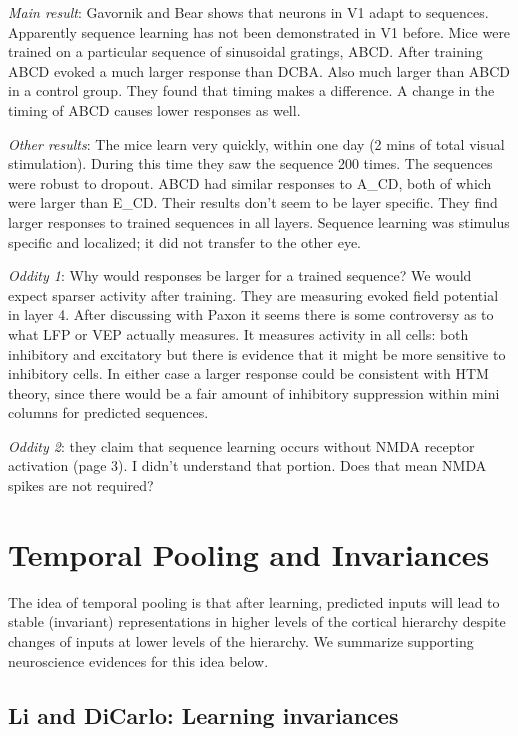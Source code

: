 \documentclass{article} %
\begin{document}
\emph{Main result}: Gavornik and Bear \cite{Gavornik2014} shows that neurons in
V1 adapt to sequences. Apparently sequence learning has not been demonstrated in
V1 before. Mice were trained on a particular sequence of sinusoidal gratings,
ABCD.  After training ABCD evoked a much larger response than DCBA. Also much
larger than ABCD in a control group.  They found that timing makes a difference.
A change in the timing of ABCD causes lower responses as well.

\emph{Other results}: The mice learn very quickly, within one day (2 mins of
total
visual stimulation). During this time they saw the sequence 200 times.  The
sequences were robust to dropout. ABCD had similar responses to A\_CD, both of
which were larger than E\_CD.  Their results don’t seem to be layer specific.
They find larger responses to trained sequences in all layers.   Sequence
learning was stimulus specific and localized; it did not transfer to the other
eye.

\emph{Oddity 1}: Why would responses be larger for a trained sequence? We would
expect
sparser activity after training. They are measuring evoked field potential in
layer 4. After discussing with Paxon it seems there is some controversy as to
what LFP or VEP actually measures. It measures activity in all cells: both
inhibitory and excitatory but there is evidence that it might be more sensitive
to inhibitory cells.  In either case a larger response could be consistent with
HTM theory, since there would be a fair amount of inhibitory suppression within
mini columns for predicted sequences.

\emph{Oddity 2}: they claim that sequence learning occurs without NMDA receptor
activation (page 3). I didn’t understand that portion. Does that mean NMDA
spikes are not required?

\section{Temporal Pooling and Invariances}

The idea of temporal pooling is that after learning, predicted inputs will
lead to stable (invariant) representations in higher levels of the cortical
hierarchy despite changes of inputs at lower levels of the hierarchy. We
summarize supporting neuroscience evidences for this idea below.

\subsection{Li and DiCarlo: Learning invariances}
\end{document}
